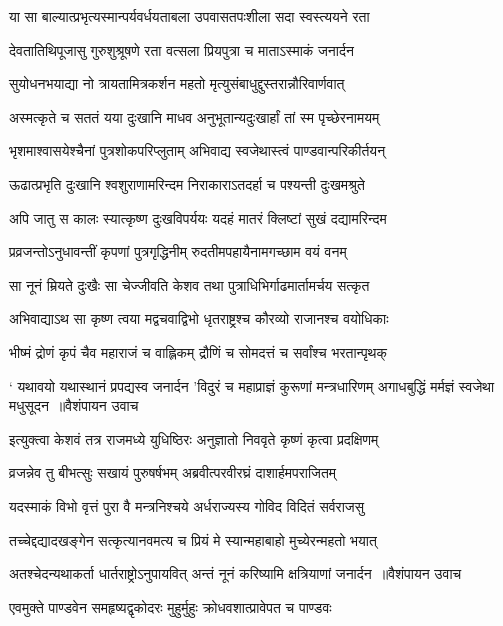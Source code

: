 \twolineshloka
{या सा बाल्यात्प्रभृत्यस्मान्पर्यवर्धयताबला}
{उपवासतपःशीला सदा स्वस्त्ययने रता}


\twolineshloka
{देवतातिथिपूजासु गुरुशुश्रूषणे रता}
{वत्सला प्रियपुत्रा च माताऽस्माकं जनार्दन}


\twolineshloka
{सुयोधनभयाद्या नो त्रायतामित्रकर्शन}
{महतो मृत्युसंबाधुद्दुस्तरान्नौरिवार्णवात्}


\twolineshloka
{अस्मत्कृते च सततं यया दुःखानि माधव}
{अनुभूतान्यदुःखार्हां तां स्म पृच्छेरनामयम्}


\twolineshloka
{भृशमाश्वासयेश्चैनां पुत्रशोकपरिप्लुताम्}
{अभिवाद्य स्वजेथास्त्वं पाण्डवान्परिकीर्तयन्}


\twolineshloka
{ऊढात्प्रभृति दुःखानि श्वशुराणामरिन्दम}
{निराकाराऽतदर्हा च पश्यन्ती दुःखमश्रुते}


\twolineshloka
{अपि जातु स कालः स्यात्कृष्ण दुःखविपर्ययः}
{यदहं मातरं क्लिष्टां सुखं दद्यामरिन्दम}


\twolineshloka
{प्रव्रजन्तोऽनुधावन्तीं कृपणां पुत्रगृद्धिनीम्}
{रुदतीमपहायैनामगच्छाम वयं वनम्}


\twolineshloka
{सा नूनं म्रियते दुःखैः सा चेज्जीवति केशव}
{तथा पुत्राधिभिर्गाढमार्तामर्चय सत्कृत}


\twolineshloka
{अभिवाद्याऽथ सा कृष्ण त्वया मद्वचवाद्विभो}
{धृतराष्ट्रश्च कौरव्यो राजानश्च वयोधिकाः}


\twolineshloka
{भीष्मं द्रोणं कृपं चैव महाराजं च वाह्लिकम्}
{द्रौणिं च सोमदत्तं च सर्वांश्च भरतान्पृथक्}


\fourlineindentedshloka
{` यथावयो यथास्थानं प्रपद्यस्व जनार्दन}
{'विदुरं च महाप्राज्ञं कुरूणां मन्त्रधारिणम्}
{अगाधबुद्धिं मर्मज्ञं स्वजेथा मधुसूदन ॥वैशंपायन उवाच}
{}


\twolineshloka
{इत्युक्त्वा केशवं तत्र राजमध्ये युधिष्ठिरः}
{अनुज्ञातो निववृते कृष्णं कृत्वा प्रदक्षिणम्}


\twolineshloka
{व्रजन्नेव तु बीभत्सुः सखायं पुरुषर्षभम्}
{अब्रवीत्परवीरघ्रं दाशार्हमपराजितम्}


\twolineshloka
{यदस्माकं विभो वृत्तं पुरा वै मन्त्रनिश्चये}
{अर्धराज्यस्य गोविद विदितं सर्वराजसु}


\twolineshloka
{तच्चेद्दद्यादखङ्गेन सत्कृत्यानवमत्य च}
{प्रियं मे स्यान्महाबाहो मुच्येरन्महतो भयात्}


\threelineshloka
{अतश्चेदन्यथाकर्ता धार्तराष्ट्रोऽनुपायवित्}
{अन्तं नूनं करिष्यामि क्षत्रियाणां जनार्दन ॥वैशंपायन उवाच}
{}


\twolineshloka
{एवमुक्ते पाण्डवेन समहृष्यद्वृकोदरः}
{मुहुर्मुहुः क्रोधवशात्प्रावेपत च पाण्डवः}


